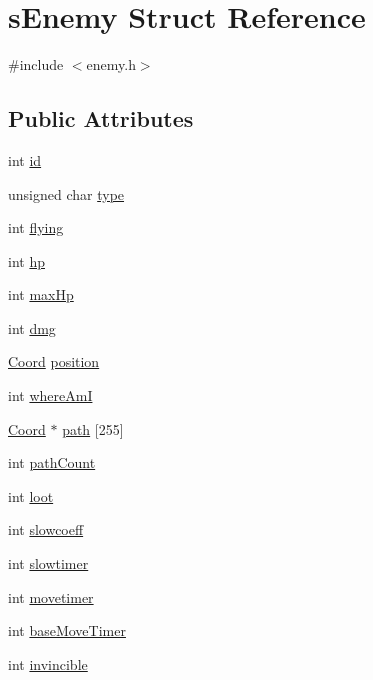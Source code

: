 \hypertarget{structs_enemy}{\section{s\-Enemy Struct Reference}
\label{structs_enemy}
}


{\ttfamily \#include $<$enemy.\-h$>$}

\subsection*{Public Attributes}
\begin{DoxyCompactItemize}
\item 
int \hyperlink{structs_enemy_abe78ad5ba13cad652d467e4fdb5681ed}{id}
\item 
unsigned char \hyperlink{structs_enemy_a489802fdb01def60e2cca9b238887d02}{type}
\item 
int \hyperlink{structs_enemy_a3564672ff00ff59fafdd7b00b7c89eac}{flying}
\item 
int \hyperlink{structs_enemy_a1bd3cc9ffeda48c3b645bfc8e4e3bb02}{hp}
\item 
int \hyperlink{structs_enemy_a20e3715f8ceaecda0f69b78cc3788eae}{max\-Hp}
\item 
int \hyperlink{structs_enemy_ac469a015604c8a1206eaacb5a9de3fae}{dmg}
\item 
\hyperlink{coordonates_8h_aff9d4468ac7a973ce7e5cfb5bd39bc33}{Coord} \hyperlink{structs_enemy_a470b9c7b6aba2b0abe9a7421c07a3441}{position}
\item 
int \hyperlink{structs_enemy_aff7c9c05f34dce9562407d02737b6b57}{where\-Am\-I}
\item 
\hyperlink{coordonates_8h_aff9d4468ac7a973ce7e5cfb5bd39bc33}{Coord} $\ast$ \hyperlink{structs_enemy_af35d52de6ce3e791d5181581d5da23a4}{path} \mbox{[}255\mbox{]}
\item 
int \hyperlink{structs_enemy_a9988dd54e1c2d27537a3bccc673e7ec1}{path\-Count}
\item 
int \hyperlink{structs_enemy_ab9b3100bc2168b242a14447e055cee56}{loot}
\item 
int \hyperlink{structs_enemy_a201f8e838aa8f1c91c35fd6c92d5acf3}{slowcoeff}
\item 
int \hyperlink{structs_enemy_a288d3987c9819d3a37f33d3649a8f8f2}{slowtimer}
\item 
int \hyperlink{structs_enemy_a67061fc603f50fececb41b9dd6a269ad}{movetimer}
\item 
int \hyperlink{structs_enemy_aabc5707d86db96a7deca75934a8cb05f}{base\-Move\-Timer}
\item 
int \hyperlink{structs_enemy_ab28dbc0855768585087a8ffbd2da9ddf}{invincible}
\end{DoxyCompactItemize}



